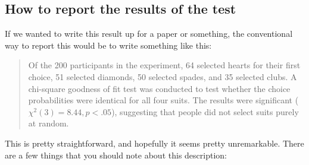 \documentclass[
  11pt,
  a4paper,
  twoside,symmetric,openright]{book}
\theoremstyle{break}
\theoremstyle{break}
\begin{document}
\subsection{How to report the results of the test}\label{chisqreport}

If we wanted to write this result up for a paper or something, the conventional way to report this would be to write something like this:

\begin{quote}
Of the 200 participants in the experiment, 64 selected hearts for their first choice, 51 selected diamonds, 50 selected spades, and 35 selected clubs. A chi-square goodness of fit test was conducted to test whether the choice probabilities were identical for all four suits. The results were significant (\(\chi^2(3) = 8.44, p<.05\)), suggesting that people did not select suits purely at random.
\end{quote}

This is pretty straightforward, and hopefully it seems pretty unremarkable. There are a few things that you should note about this description:
\end{document}
